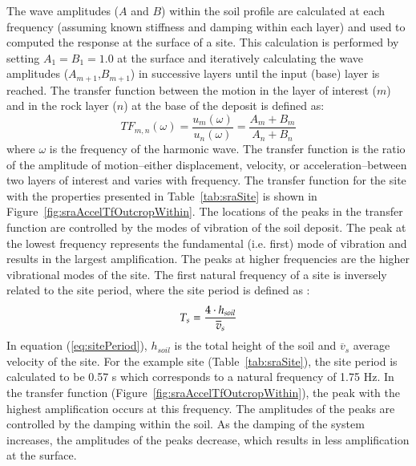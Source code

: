 \documentclass[11pt]{report}
\begin{document}
The wave amplitudes ($A$ and $B$) within the soil profile are calculated at each frequency (assuming
known stiffness and damping within each layer) and used to computed the response at the surface of a
site.  This calculation is performed by setting $A_{1}=B_{1}=1.0$ at the surface and iteratively
calculating the wave amplitudes ($A_{m+1}$,$B_{m+1}$) in successive layers until the input (base)
layer is reached.  The transfer function between the motion in the layer of interest ($m$) and in
the rock layer ($n$) at the base of the deposit is defined as:
\begin{equation}
  TF_{m,n}(\omega) = \frac{u_m(\omega)}{u_n(\omega)}= \frac{A_m + B_m}{A_n + B_n}
  \label{eq:transFunc}
\end{equation}
where $\omega$ is the frequency of the harmonic wave.  The transfer function is the ratio of the
amplitude of motion--either displacement, velocity, or acceleration--between two layers of interest
and varies with frequency.  The transfer function for the site with the properties presented in
Table~\ref{tab:sraSite} is shown in Figure~\ref{fig:sraAccelTfOutcropWithin}.  The locations of the
peaks in the transfer function are controlled by the modes of vibration of the soil deposit.  The
peak at the lowest frequency represents the fundamental (i.e. first) mode of vibration and results
in the largest amplification.  The peaks at higher frequencies are the higher vibrational modes of
the site.  The first natural frequency of a site is inversely related to the site period, where the
site period is defined as \citep{kramer:96}:
\begin{equation}
  T_s = \frac{4\cdot h_{soil}}{\overline{v}_s}\\ 
  \label{eq:sitePeriod}
\end{equation}
In equation (\ref{eq:sitePeriod}), $h_{soil}$ is the total height of the soil and $\overline{v}_s$
average velocity of the site.  For the example site (Table~\ref{tab:sraSite}), the site period is
calculated to be 0.57 s which corresponds to a natural frequency of 1.75 Hz.  In the transfer
function (Figure~\ref{fig:sraAccelTfOutcropWithin}), the peak with the highest amplification occurs
at this frequency.  The amplitudes of the peaks are controlled by the damping within the soil.  As
the damping of the system increases, the amplitudes of the peaks decrease, which results in less
amplification at the surface.
\end{document}
